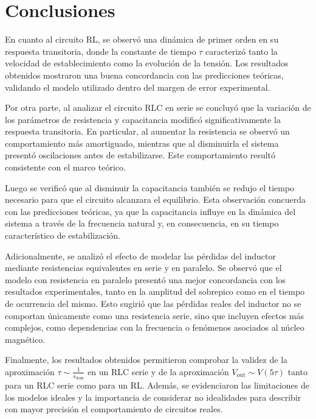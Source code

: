 
\section{Conclusiones}
En cuanto al circuito RL, se observó una dinámica de primer orden en su respuesta transitoria, donde la constante de tiempo $\tau$ caracterizó tanto la velocidad de establecimiento como la evolución de la tensión. Los resultados obtenidos mostraron una buena concordancia con las predicciones teóricas, validando el modelo utilizado dentro del margen de error experimental.

Por otra parte, al analizar el circuito RLC en serie se concluyó que la variación de los parámetros de resistencia y capacitancia modificó significativamente la respuesta transitoria. En particular, al aumentar la resistencia se observó un comportamiento más amortiguado, mientras que al disminuirla el sistema presentó oscilaciones antes de estabilizarse. Este comportamiento resultó consistente con el marco teórico. 

Luego se verificó que al disminuir la capacitancia también se redujo el tiempo necesario para que el circuito alcanzara el equilibrio. Esta observación concuerda con las predicciones teóricas, ya que la capacitancia influye en la dinámica del sistema a través de la frecuencia natural y, en consecuencia, en su tiempo característico de estabilización.

Adicionalmente, se analizó el efecto de modelar las pérdidas del inductor mediante resistencias equivalentes en serie y en paralelo. Se observó que el modelo con resistencia en paralelo presentó una mejor concordancia con los resultados experimentales, tanto en la amplitud del sobrepico como en el tiempo de ocurrencia del mismo. Esto sugirió que las pérdidas reales del inductor no se comportan únicamente como una resistencia serie, sino que incluyen efectos más complejos, como dependencias con la frecuencia o fenómenos asociados al núcleo magnético.

Finalmente, los resultados obtenidos permitieron comprobar la validez de la aproximación $\tau \sim \frac{1}{s_\text{dom}}$ en un RLC serie y de la aproximación $V_\text{out} \sim V(5\tau)$ tanto para un RLC serie como para un RL. Además, se evidenciaron las limitaciones de los modelos ideales y la importancia de considerar no idealidades para describir con mayor precisión el comportamiento de circuitos reales.

\newpage

